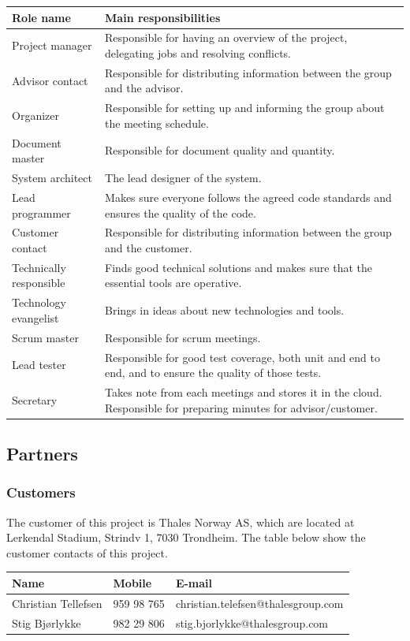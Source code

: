 \begin{tabular}{|l | p{10cm}|}
	\hline
	\textbf{Role name} & \textbf{Main responsibilities}  \\ \hline
	Project manager & Responsible for having an overview of the project, delegating jobs and resolving conflicts. \\ \hline
	Advisor contact & Responsible for distributing information between the group and the advisor. \\ \hline
	Organizer & Responsible for setting up and informing the group about the meeting schedule. \\ \hline
	Document master & Responsible for document quality and quantity. \\ \hline
	System architect & The lead designer of the system. \\ \hline
	Lead programmer & Makes sure everyone follows the agreed code standards and ensures the quality of the code. \\ \hline
	Customer contact & Responsible for distributing information between the group and the customer. \\ \hline
	Technically responsible & Finds good technical solutions and makes sure that the essential tools are operative. \\ \hline
	Technology evangelist & Brings in ideas about new technologies and tools. \\ \hline
	Scrum master & Responsible for scrum meetings. \\ \hline
	Lead tester & Responsible for good test coverage, both unit and end to end, and to ensure the quality of those tests. \\ \hline
	Secretary & Takes note from each meetings and stores it in the cloud. Responsible for preparing minutes for advisor/customer. \\ \hline

\end{tabular}

\subsection{Partners}

\subsubsection{Customers}
The customer of this project is Thales Norway AS, which are located at Lerkendal Stadium, Strindv 1, 7030 Trondheim.
The table below show the customer contacts of this project. \newline
\begin{tabular}{|l |l |l |}
	\hline
	\textbf{Name} & \textbf{Mobile} & \textbf{E-mail}  \\ \hline
	Christian Tellefsen & 959 98 765 & christian.telefsen@thalesgroup.com \\ \hline
	Stig Bjørlykke & 982 29 806 & stig.bjorlykke@thalesgroup.com \\ \hline
\end{tabular}


